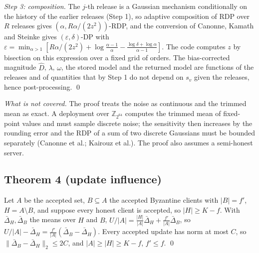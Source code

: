 \documentclass[11pt]{article}
\theoremstyle{plain}
\theoremstyle{definition}
\newcommand{\Dhat}{\widehat{D}}
\begin{document}
\emph{Step 3: composition.} The $j$-th release is a Gaussian mechanism conditionally on the history of the earlier releases (Step 1), so adaptive composition of RDP over $R$ releases gives $(\alpha,R\alpha/(2z^2))$-RDP, and the conversion of Canonne, Kamath and Steinke gives $(\varepsilon,\delta)$-DP with $\varepsilon=\min_{\alpha>1}[R\alpha/(2z^2)+\log\frac{\alpha-1}{\alpha}-\frac{\log\delta+\log\alpha}{\alpha-1}]$. The code computes $z$ by bisection on this expression over a fixed grid of orders. The bias-corrected magnitude $\Dhat$, $\lambda$, $\omega$, the stored model and the returned model are functions of the releases and of quantities that by Step 1 do not depend on $s_v$ given the releases, hence post-processing. \qed

\emph{What is not covered.} The proof treats the noise as continuous and the trimmed mean as exact. A deployment over $\mathbb{Z}_{2^{64}}$ computes the trimmed mean of fixed-point values and must sample discrete noise; the sensitivity then increases by the rounding error and the RDP of a sum of two discrete Gaussians must be bounded separately (Canonne et al.; Kairouz et al.). The proof also assumes a semi-honest server.

\subsection*{Theorem 4 (update influence)}
Let $A$ be the accepted set, $B\subseteq A$ the accepted Byzantine clients with $|B|=f'$, $H=A\setminus B$, and suppose every honest client is accepted, so $|H|\ge K-f$. With $\bar\Delta_H,\bar\Delta_B$ the means over $H$ and $B$, $U/|A|=\frac{|H|}{|A|}\bar\Delta_H+\frac{f'}{|A|}\bar\Delta_B$, so $U/|A|-\bar\Delta_H=\frac{f'}{|A|}(\bar\Delta_B-\bar\Delta_H)$. Every accepted update has norm at most $C$, so $\|\bar\Delta_B-\bar\Delta_H\|_2\le2C$, and $|A|\ge|H|\ge K-f$, $f'\le f$. \qed
\end{document}
